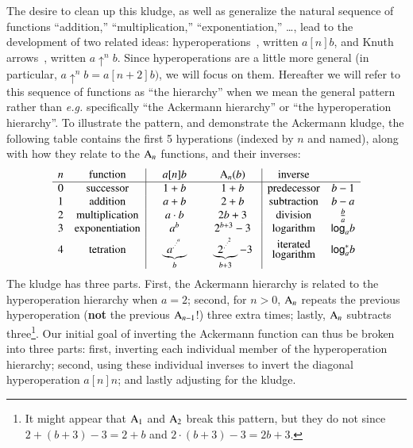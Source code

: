The desire to clean up this kludge, as well as generalize the natural sequence of functions ``addition,'' ``multiplication,'' ``exponentiation,'' \ldots, lead to the development of two
related ideas: hyperoperations~\cite{blah}, written $a [n] b$, and Knuth arrows~\cite{blah}, written
$a \uparrow^n b$.  Since hyperoperations are a little more general (in particular, $a \uparrow^n b = a[n+2]b)$, we will focus on them.  Hereafter we will refer to this sequence of functions as ``the hierarchy'' when we mean the general pattern rather than \emph{e.g.} specifically ``the Ackermann hierarchy'' or ``the hyperoperation hierarchy''.  To illustrate the pattern, and demonstrate the Ackermann kludge, the following table contains the first 5 hyperations (indexed by $n$ and named), along with how they relate to the $\text{A}_n$ functions, and their inverses:
\[
\begin{array}{cc|cc|cc}
n & \text{function} & \quad a [n] b \quad & \quad \Ack_n(b) \quad & \text{inverse} \\
\hline
0 & \text{successor} & 1 + b & 1 + b & \text{predecessor} & b - 1 \\
1 & \text{addition} & a + b & 2 + b & \text{subtraction} & b - a \\
2 & \text{multiplication} & a \cdot b & 2b + 3 & \text{division} & \frac{b}{a}\\
3 & \text{exponentiation} & a^b & 2^{b + 3} - 3 & \text{logarithm} & \mathsf{log}_a b \\
[2pt]
4 & \text{tetration} & \underbrace{a^{.^{.^{.^a}}}}_b & \underbrace{2^{.^{.^{.^2}}}}_{b+3} - 3 & \begin{array}{@{}c@{}}\text{iterated}\\[-3pt]\text{logarithm}\end{array} & \mathsf{log}^*_a b 
\end{array}
\]
The kludge has three parts.  First, the Ackermann hierarchy is related to the hyperoperation hierarchy when $a=2$; second, for $n>0$, $\text{A}_n$ repeats the previous hyperoperation (\textbf{not} the previous $\text{A}_{n-1}$!) three extra times; lastly, $\text{A}_n$ subtracts three\footnote{It might appear that $\text{A}_{1}$ and $\text{A}_{2}$
break this pattern, but they do not since $2 + (b + 3) - 3 = 2 + b$ and $2 \cdot (b + 3) - 3 = 2b + 3$.}.  Our initial goal of inverting the Ackermann function can thus be broken
into three parts: first, inverting each individual member of the hyperoperation hierarchy; second, using these individual inverses to invert the diagonal hyperoperation {\color{red}$a [n] n$}; and lastly adjusting for the kludge.

